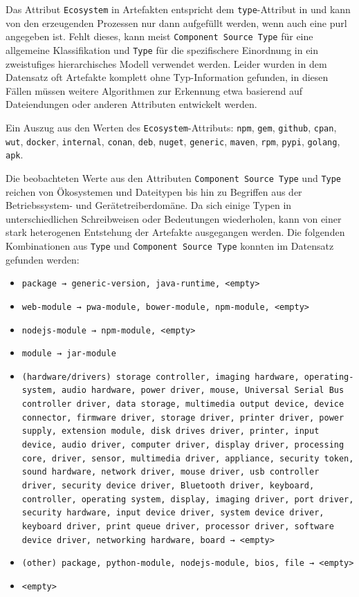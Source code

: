Das Attribut \texttt{Ecosystem} in Artefakten entspricht dem \texttt{type}-Attribut in  und kann von den erzeugenden Prozessen nur dann aufgefüllt werden, wenn auch eine \acrshort{purl} angegeben ist.
Fehlt dieses, kann meist \texttt{Component Source Type} für eine allgemeine Klassifikation und \texttt{Type} für die spezifischere Einordnung in ein zweistufiges hierarchisches Modell verwendet werden.
Leider wurden in dem Datensatz oft Artefakte komplett ohne Typ-Information gefunden, in diesen Fällen müssen weitere Algorithmen zur Erkennung etwa basierend auf Dateiendungen oder anderen Attributen entwickelt werden.

Ein Auszug aus den Werten des \texttt{Ecosystem}-Attributs:
\texttt{npm}, \texttt{gem}, \texttt{github}, \texttt{cpan}, \texttt{wut}, \texttt{docker}, \texttt{internal}, \texttt{conan}, \texttt{deb}, \texttt{nuget}, \texttt{generic}, \texttt{maven}, \texttt{rpm}, \texttt{pypi}, \texttt{golang}, \texttt{apk}.

Die beobachteten Werte aus den Attributen \texttt{Component Source Type} und \texttt{Type} reichen von Ökosystemen und Dateitypen bis hin zu Begriffen aus der Betriebssystem- und Gerätetreiberdomäne.
Da sich einige Typen in unterschiedlichen Schreibweisen oder Bedeutungen wiederholen, kann von einer stark heterogenen Entstehung der Artefakte ausgegangen werden.
Die folgenden Kombinationen aus \texttt{Type} und \texttt{Component Source Type} konnten im Datensatz gefunden werden:

\begin{itemize}
    \itemsep0em

    \item \texttt{package → generic-version, java-runtime, <empty>}
    \item \texttt{web-module → pwa-module, bower-module, npm-module, <empty>}
    \item \texttt{nodejs-module → npm-module, <empty>}
    \item \texttt{module → jar-module}

    \item \texttt{(hardware/drivers) storage controller, imaging hardware, operating-system, audio hardware, power driver, mouse, Universal Serial Bus controller driver, data storage, multimedia output device, device connector, firmware driver, storage driver, printer driver, power supply, extension module, disk drives driver, printer, input device, audio driver, computer driver, display driver, processing core, driver, sensor, multimedia driver, appliance, security token, sound hardware, network driver, mouse driver, usb controller driver, security device driver, Bluetooth driver, keyboard, controller, operating system, display, imaging driver, port driver, security hardware, input device driver, system device driver, keyboard driver, print queue driver, processor driver, software device driver, networking hardware, board → <empty>}
    \item \texttt{(other) package, python-module, nodejs-module, bios, file → <empty>}
    \item \texttt{<empty>}
\end{itemize}

